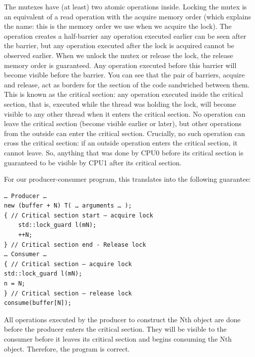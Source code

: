 The mutexes have (at least) two atomic operations inside. Locking the mutex is an equivalent of a read operation with the acquire memory order (which explains the name: this is the memory order we use when we acquire the lock). The operation creates a half-barrier any operation executed earlier can be seen after the barrier, but any operation executed after the lock is acquired cannot be observed earlier. When we unlock the mutex or release the lock, the release memory order is guaranteed. Any operation executed before this barrier will become visible before the barrier. You can see that the pair of barriers, acquire and release, act as borders for the section of the code sandwiched between them. This is known as the critical section: any operation executed inside the critical section, that is, executed while the thread was holding the lock, will become visible to any other thread when it enters the critical section. No operation can leave the critical section (become visible earlier or later), but other operations from the outside can enter the critical section. Crucially, no such operation can cross the critical section: if an outside operation enters the critical section, it cannot leave. So, anything that was done by CPU0 before its critical section is guaranteed to be visible by CPU1 after its critical section.

For our producer-consumer program, this translates into the following guarantee:

\begin{lstlisting}[style=styleCXX]
… Producer …
new (buffer + N) T( … arguments … );
{ // Critical section start – acquire lock
	std::lock_guard l(mN);
	++N;
} // Critical section end - Release lock
… Consumer …
{ // Critical section – acquire lock
std::lock_guard l(mN);
n = N;
} // Critical section – release lock
consume(buffer[N]);
\end{lstlisting}

All operations executed by the producer to construct the Nth object are done before the producer enters the critical section. They will be visible to the consumer before it leaves its critical section and begins consuming the Nth object. Therefore, the program is correct.

